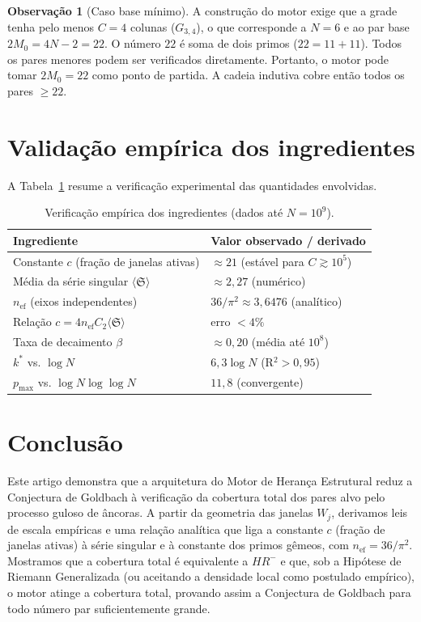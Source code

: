 \documentclass[11pt]{article}
\theoremstyle{definition}
\newtheorem{remark}[theorem]{Observação}
\begin{document}
	\begin{remark}[Caso base mínimo]
		A construção do motor exige que a grade tenha pelo menos $C=4$ colunas ($G_{3,4}$), o que corresponde a $N=6$ e ao par base $2M_0 = 4N-2 = 22$. O número $22$ é soma de dois primos ($22 = 11+11$). Todos os pares menores podem ser verificados diretamente. Portanto, o motor pode tomar $2M_0=22$ como ponto de partida. A cadeia indutiva cobre então todos os pares $\ge 22$.
	\end{remark}
	
	\section{Validação empírica dos ingredientes}
	
	A Tabela~\ref{tab:ingredientes} resume a verificação experimental das quantidades envolvidas.
	
	\begin{table}[h]
		\centering
		\caption{Verificação empírica dos ingredientes (dados até $N=10^9$).}
		\label{tab:ingredientes}
		\begin{tabular}{ll}
			\toprule
			Ingrediente & Valor observado / derivado \\
			\midrule
			Constante $c$ (fração de janelas ativas) & $\approx 21$ (estável para $C\gtrsim10^5$) \\
			Média da série singular $\langle\mathfrak{S}\rangle$ & $\approx 2{,}27$ (numérico) \\
			$n_{\text{ef}}$ (eixos independentes) & $36/\pi^2 \approx 3{,}6476$ (analítico) \\
			Relação $c = 4n_{\text{ef}}C_2\langle\mathfrak{S}\rangle$ & erro $<4\%$ \\
			Taxa de decaimento $\beta$ & $\approx 0{,}20$ (média até $10^8$) \\
			$k^*$ vs. $\log N$ & $6{,}3\log N$ (R$^2>0{,}95$) \\
			$p_{\max}$ vs. $\log N\log\log N$ & $11{,}8$ (convergente) \\
			\bottomrule
		\end{tabular}
	\end{table}
	
	\section{Conclusão}
	
	Este artigo demonstra que a arquitetura do Motor de Herança Estrutural reduz a Conjectura de Goldbach à verificação da cobertura total dos pares alvo pelo processo guloso de âncoras. A partir da geometria das janelas $W_j$, derivamos leis de escala empíricas e uma relação analítica que liga a constante $c$ (fração de janelas ativas) à série singular e à constante dos primos gêmeos, com $n_{\text{ef}} = 36/\pi^2$. Mostramos que a cobertura total é equivalente a $HR^-$ e que, sob a Hipótese de Riemann Generalizada (ou aceitando a densidade local como postulado empírico), o motor atinge a cobertura total, provando assim a Conjectura de Goldbach para todo número par suficientemente grande.
	
\end{document}
